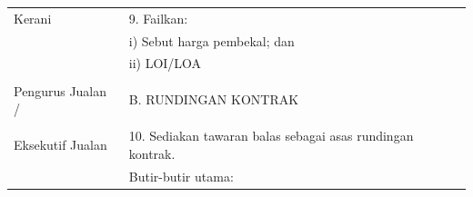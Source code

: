\documentclass[
]{article}
\begin{document}
\begin{longtable}[]{@{}ll@{}}
\begin{minipage}[t]{0.27\columnwidth}
Kerani\strut
\end{minipage} & \begin{minipage}[t]{0.67\columnwidth}\raggedright
9. Failkan:\strut
\end{minipage}\tabularnewline
\begin{minipage}[t]{0.27\columnwidth}\raggedright
\strut
\end{minipage} & \begin{minipage}[t]{0.67\columnwidth}\raggedright
i) Sebut harga pembekal; dan\strut
\end{minipage}\tabularnewline
\begin{minipage}[t]{0.27\columnwidth}\raggedright
\strut
\end{minipage} & \begin{minipage}[t]{0.67\columnwidth}\raggedright
ii) LOI/LOA\strut
\end{minipage}\tabularnewline
\begin{minipage}[t]{0.27\columnwidth}\raggedright
\strut
\end{minipage} & \begin{minipage}[t]{0.67\columnwidth}\raggedright
\strut
\end{minipage}\tabularnewline
\begin{minipage}[t]{0.27\columnwidth}\raggedright
Pengurus Jualan /\strut
\end{minipage} & \begin{minipage}[t]{0.67\columnwidth}\raggedright
B. RUNDINGAN KONTRAK\strut
\end{minipage}\tabularnewline
\begin{minipage}[t]{0.27\columnwidth}\raggedright
\strut
\end{minipage} & \begin{minipage}[t]{0.67\columnwidth}\raggedright
\strut
\end{minipage}\tabularnewline
\begin{minipage}[t]{0.27\columnwidth}\raggedright
Eksekutif Jualan\strut
\end{minipage} & \begin{minipage}[t]{0.67\columnwidth}\raggedright
10. Sediakan tawaran balas sebagai asas rundingan kontrak.\strut
\end{minipage}\tabularnewline
\begin{minipage}[t]{0.27\columnwidth}\raggedright
\strut
\end{minipage} & \begin{minipage}[t]{0.67\columnwidth}\raggedright
Butir-butir utama:\strut
\end{minipage}\tabularnewline

\end{longtable}
\end{document}
